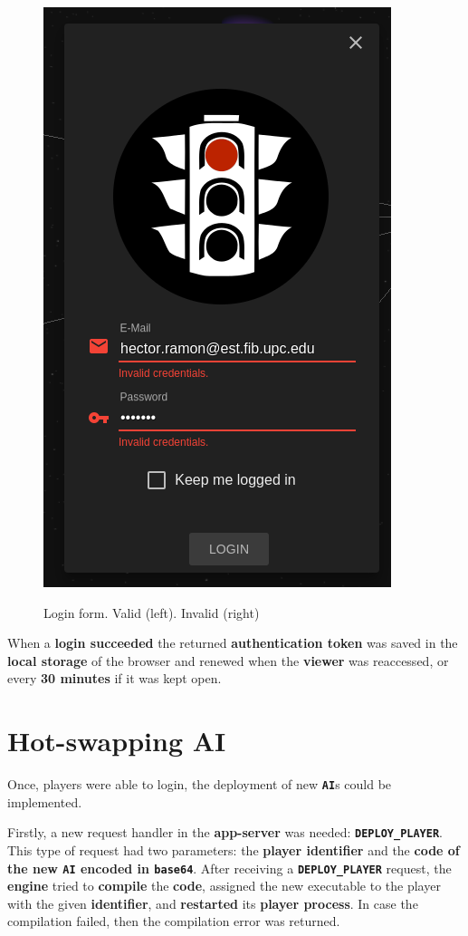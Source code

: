 \documentclass[a4paper,11pt,titlepage,abstract,numbers=noenddot,automark,mnsy,intlimits,rgb,dvipsnames]{report}
\begin{document}
\begin{figure}[H]
{{\includegraphics{images/login_error.png}
}
}
\caption{Login form. Valid (left). Invalid (right)}
\label{login_form}
\end{figure}
When a \textbf{login succeeded} the returned \textbf{authentication token} was saved in the \textbf{local storage} of the browser and renewed
when the \textbf{viewer} was reaccessed, or every \textbf{30 minutes} if it was kept open.
\section{Hot-swapping AI}
Once, players were able to login, the deployment of new \textbf{\texttt{AI}}s could be implemented.

Firstly, a new request handler in the \textbf{app-server} was needed: \textbf{\texttt{DEPLOY\_PLAYER}}. This type of request had two
parameters: the \textbf{player identifier} and the \textbf{code of the new \texttt{AI} encoded in \texttt{base64}}. After receiving a \textbf{\texttt{DEPLOY\_PLAYER}}
request, the \textbf{engine} tried to \textbf{compile} the \textbf{code}, assigned the new executable to the player with the given \textbf{identifier},
and \textbf{restarted} its \textbf{player process}. In case the compilation failed, then the compilation error was returned.
\end{document}
